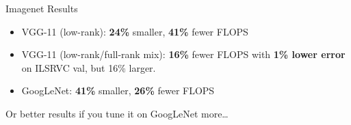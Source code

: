 \documentclass[t,xcolor=dvipsnames]{beamer}
\begin{document}
\begin{frame}{Imagenet Results}

\begin{itemize}
    \item VGG-11 (low-rank): \textbf{24\%} smaller, \textbf{41\%} fewer FLOPS
    \item VGG-11 (low-rank/full-rank mix): \textbf{16\%} fewer FLOPS with \textbf{1\% lower error} on ILSRVC val, but 16\% larger.
    \item GoogLeNet: \textbf{41\%} smaller, \textbf{26\%} fewer FLOPS
\end{itemize}
\vfill
Or better results if you tune it on GoogLeNet more\ldots
\end{frame}
\end{document}
